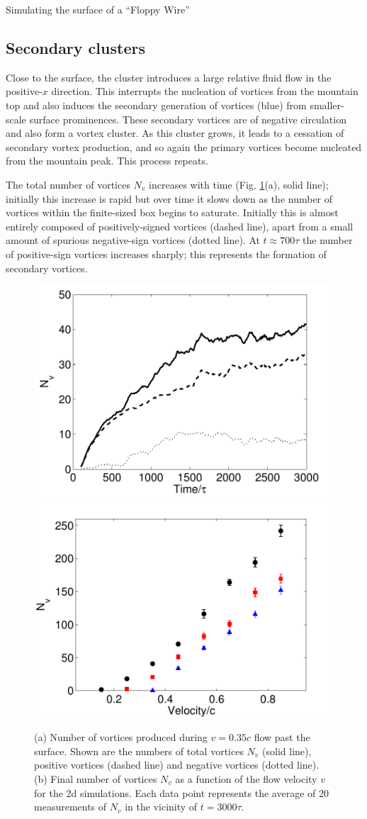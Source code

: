\begin{chapter}{\label{cha:afm}Simulating the surface of a ``Floppy Wire''}
\subsection{Secondary clusters}
Close to the surface, the cluster introduces a large relative fluid flow in the positive-$x$ direction.  This interrupts the nucleation of vortices from the mountain top and also induces the secondary generation of vortices (blue) from smaller-scale surface prominences.  These secondary vortices are of negative circulation and also form a vortex cluster. As this cluster grows, it leads to a cessation of secondary vortex production, and so again the primary vortices become nucleated from the mountain peak.  This process repeats.

The total number of vortices $N_v$ increases with time (Fig. \ref{fig:nvort}(a), solid line); initially this increase is rapid but over time it slows down as the number of vortices within the finite-sized box begins to saturate.  Initially this is almost entirely composed of positively-signed vortices (dashed line), apart from a small amount of spurious negative-sign vortices (dotted line).  At $t\approx 700 \tau$ the number of positive-sign vortices increases sharply; this represents the formation of secondary vortices. 

\begin{figure}
\centering
\includegraphics[width=0.45\linewidth]{./afm/figures/nvpn3bw}
\includegraphics[width=0.45\linewidth]{./afm/figures/nv_v}
\caption{\label{fig:nvort} (a) Number of vortices produced during $v=0.35c$ flow past the surface.  Shown are the numbers of total vortices $N_v$ (solid line), positive vortices (dashed line) and negative vortices (dotted line). (b) Final number of vortices $N_v$ as a function of the flow velocity $v$ for the 2d simulations.  Each data point represents the average of 20 measurements of $N_v$ in the vicinity of $t=3000\tau$.}
\end{figure} 


\end{chapter}
